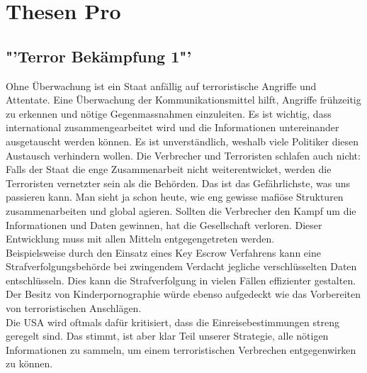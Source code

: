 \section*{Thesen Pro}
\subsection{"'Terror Bekämpfung 1"'}
Ohne Überwachung ist ein Staat anfällig auf terroristische Angriffe und 
Attentate. Eine Überwachung der Kommunikationsmittel hilft, Angriffe 
frühzeitig zu erkennen und nötige Gegenmassnahmen einzuleiten. Es ist 
wichtig, dass international zusammengearbeitet wird und die 
Informationen untereinander ausgetauscht werden können. Es ist 
unverst\"andlich, weshalb viele Politiker diesen Austausch verhindern wollen. Die 
Verbrecher und Terroristen schlafen auch nicht: Falls der Staat die enge 
Zusammenarbeit nicht weiterentwicket, werden die Terroristen vernetzter sein als 
die Beh\"orden. Das ist das Gefährlichste, was uns passieren kann. Man sieht ja 
schon heute, wie eng gewisse mafiöse Strukturen zusammenarbeiten und 
global agieren. Sollten die Verbrecher den Kampf um die Informationen 
und Daten gewinnen, hat die Gesellschaft verloren. Dieser Entwicklung
muss mit allen Mitteln entgegengetreten werden.\\
Beispielsweise durch den Einsatz eines Key Escrow Verfahrens kann eine 
Strafverfolgungsbehörde bei zwingendem Verdacht jegliche 
verschlüsselten Daten entschlüsseln. Dies kann die Strafverfolgung in 
vielen Fällen effizienter gestalten. Der Besitz von Kinderpornographie 
würde ebenso aufgedeckt wie das Vorbereiten von terroristischen 
Anschlägen.\\
Die USA wird oftmals dafür kritisiert, dass die 
Einreisebestimmungen streng geregelt sind. Das stimmt, ist aber klar 
Teil unserer Strategie, alle nötigen Informationen zu sammeln, um einem 
terroristischen Verbrechen entgegenwirken zu können.

